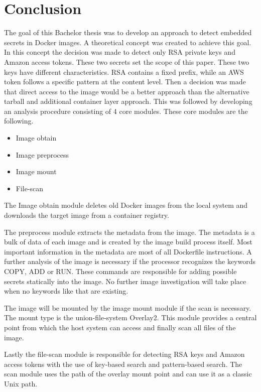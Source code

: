 \chapter{Conclusion}
\label{ch:end:conclusion}
The goal of this Bachelor thesis was to develop an approach to detect embedded secrets in Docker images. 
A theoretical concept was created to achieve this goal. 
In this concept the decision was made to detect only RSA private keys and Amazon access tokens.
These two secrets set the scope of this paper. These two keys have different characteristics.
RSA contains a fixed prefix, while an AWS token follows a specific pattern at the content level.
Then a decision was made that direct access to the image would be a better approach than the alternative tarball and additional container layer approach.
This was followed by developing an analysis procedure consisting of 4 core modules.
These core modules are the following.
\begin{itemize}
    \item Image obtain
    \item Image preprocess
    \item Image mount
    \item File-scan
    \end{itemize}
The Image obtain module deletes old Docker images from the local system and downloads the target image from a container registry.

The preprocess module extracts the metadata from the image. 
The metadata is a bulk of data of each image and is created by the image build process itself.
Most important information in the metadata are most of all Dockerfile instructions.
A further analysis of the image is necessary if the processor recognizes the keywords COPY, ADD or RUN.
These commands are responsible for adding possible secrets statically into the image. 
No further image investigation will take place when no keywords like that are existing. 

The image will be mounted by the image mount module if the scan is necessary. The mount type is the union-file-system Overlay2.
This module provides a central point from which the host system can access and finally scan all files of the image.

Lastly the file-scan module is responsible for detecting RSA keys and Amazon access tokens with the use of key-based search and pattern-based search.
The scan module uses the path of the overlay mount point and can use it as a classic Unix path.

